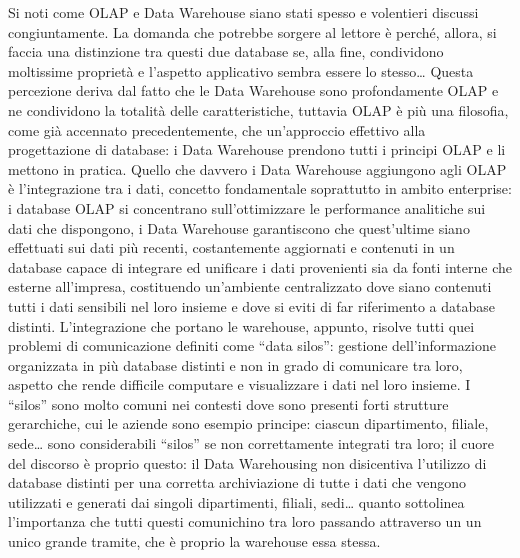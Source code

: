 \documentclass[a4paper,12pt]{report}
\begin{document}
Si noti come OLAP e Data Warehouse siano stati spesso e volentieri discussi congiuntamente. La domanda che potrebbe sorgere al lettore è perché, allora, si faccia una distinzione tra questi due database se, alla fine, condividono moltissime proprietà e l’aspetto applicativo sembra essere lo stesso… Questa percezione deriva dal fatto che le Data Warehouse sono profondamente OLAP e ne condividono la totalità delle caratteristiche, tuttavia OLAP è più una filosofia, come già accennato precedentemente, che un’approccio effettivo alla progettazione di database: i Data Warehouse prendono tutti i principi OLAP e li mettono in pratica. Quello che davvero i Data Warehouse aggiungono agli OLAP è l’integrazione tra i dati, concetto fondamentale soprattutto in ambito enterprise: i database OLAP si concentrano sull’ottimizzare le performance analitiche sui dati che dispongono, i Data Warehouse garantiscono che quest’ultime siano effettuati sui dati più recenti, costantemente aggiornati e contenuti in un database capace di integrare ed unificare i dati provenienti sia da fonti interne che esterne all’impresa, costituendo un’ambiente centralizzato dove siano contenuti tutti i dati sensibili nel loro insieme e dove si eviti di far riferimento a database distinti. L’integrazione che portano le warehouse, appunto, risolve tutti quei problemi di comunicazione definiti come “data silos”: gestione dell’informazione organizzata in più database distinti e non in grado di comunicare tra loro, aspetto che rende difficile computare e visualizzare i dati nel loro insieme. I “silos” sono molto comuni nei contesti dove sono presenti forti strutture gerarchiche, cui le aziende sono esempio principe: ciascun dipartimento, filiale, sede… sono considerabili “silos” se non correttamente integrati tra loro; il cuore del discorso è proprio questo: il Data Warehousing non disicentiva l’utilizzo di database distinti per una corretta archiviazione di tutte i dati che vengono utilizzati e generati dai singoli dipartimenti, filiali, sedi… quanto sottolinea l’importanza che tutti questi comunichino tra loro passando attraverso un un unico grande tramite, che è proprio la warehouse essa stessa.
\\[0ex]
\end{document}
